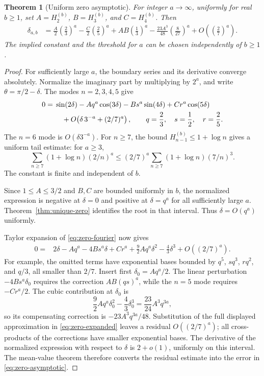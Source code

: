 \documentclass[11pt,a4paper]{article}
\numberwithin{equation}{section}
\newtheorem{theorem}{Theorem}[section]
\theoremstyle{definition}
\theoremstyle{remark}
\begin{document}
\begin{theorem}[Uniform zero asymptotic]\label{thm:zero-asymptotic}
For integer $a\to\infty$, uniformly for real $b\ge1$, set
$A=H_2^{(b)}$, $B=H_3^{(b)}$, and $C=H_4^{(b)}$. Then
\begin{align}\label{eq:zero-asymptotic}
 \delta_{a,b}
 &=\frac A2\left(\frac23\right)^a
   -\frac C2\left(\frac25\right)^a
   +AB\left(\frac13\right)^a
   -\frac{23A^3}{48}\left(\frac8{27}\right)^a
   +O\!\left(\left(\frac27\right)^a\right).
\end{align}
The implied constant and the threshold for $a$ can be chosen independently of $b\ge1$.
\end{theorem}
\begin{proof}
For sufficiently large $a$, the boundary series and its derivative converge absolutely. Normalize the imaginary part by multiplying by $2^a$, and write $\theta=\pi/2-\delta$. The modes $n=2,3,4,5$ give
\begin{align}\label{eq:zero-fourier}
 0={}&\sin(2\delta)-Aq^a\cos(3\delta)-Bs^a\sin(4\delta)
       +Cr^a\cos(5\delta)\notag\\
    &\quad+O\!\left(\delta\,3^{-a}+(2/7)^a\right),
 \qquad q=\frac23,\quad s=\frac12,\quad r=\frac25.
\end{align}
The $n=6$ mode is $O(\delta3^{-a})$. For $n\ge7$, the bound
$H_{n-1}^{(b)}\le1+\log n$ gives a uniform tail estimate: for $a\ge3$,
\[
 \sum_{n\ge7}(1+\log n)(2/n)^a
 \le (2/7)^a\sum_{n\ge7}(1+\log n)(7/n)^3.
\]
The constant is finite and independent of $b$.

Since $1\le A\le3/2$ and $B,C$ are bounded uniformly in $b$, the normalized expression is negative at $\delta=0$ and positive at $\delta=q^a$ for all sufficiently large $a$. Theorem~\ref{thm:unique-zero} identifies the root in that interval. Thus $\delta=O(q^a)$ uniformly.

Taylor expansion of \eqref{eq:zero-fourier} now gives
\begin{align}\label{eq:zero-expanded}
 0={}&2\delta-Aq^a-4Bs^a\delta+Cr^a
       +\frac92Aq^a\delta^2-\frac43\delta^3
       +O((2/7)^a).
\end{align}
For example, the omitted terms have exponential bases bounded by
$q^5$, $sq^3$, $rq^2$, and $q/3$, all smaller than $2/7$. Insert first
$\delta_0=Aq^a/2$. The linear perturbation $-4Bs^a\delta_0$ requires the correction $AB(qs)^a$, while the $n=5$ mode requires $-Cr^a/2$.
The cubic contribution at $\delta_0$ is
\[
 \frac92Aq^a\delta_0^2-\frac43\delta_0^3
 =\frac{23}{24}A^3q^{3a},
\]
so its compensating correction is $-23A^3q^{3a}/48$.
Substitution of the full displayed approximation in \eqref{eq:zero-expanded} leaves a residual $O((2/7)^a)$; all cross-products of the corrections have smaller exponential bases. The derivative of the normalized expression with respect to $\delta$ is $2+o(1)$, uniformly on this interval. The mean-value theorem therefore converts the residual estimate into the error in \eqref{eq:zero-asymptotic}.
\end{proof}
\end{document}
